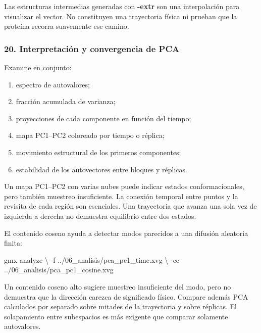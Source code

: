 \documentclass[
  spanish,
  11pt,
  a4paper]{article}
\newenvironment{Shaded}{\begin{snugshade}}{\end{snugshade}}
\newcommand{\AttributeTok}[1]{\textcolor[rgb]{0.13,0.29,0.53}{#1}}
\newcommand{\DataTypeTok}[1]{\textcolor[rgb]{0.13,0.29,0.53}{#1}}
\newcommand{\ExtensionTok}[1]{#1}
\newcommand{\NormalTok}[1]{#1}
\providecommand{\tightlist}{%
  \setlength{\itemsep}{0pt}\setlength{\parskip}{0pt}}
\begin{document}
Las estructuras intermedias generadas con \textbf{-extr} son una
interpolación para visualizar el vector. No constituyen una trayectoria
física ni prueban que la proteína recorra suavemente ese camino.

\subsubsection{20. Interpretación y convergencia de
PCA}\label{interpretaciuxf3n-y-convergencia-de-pca}

Examine en conjunto:

\begin{enumerate}
\def\labelenumi{\arabic{enumi}.}
\tightlist
\item
  espectro de autovalores;
\item
  fracción acumulada de varianza;
\item
  proyecciones de cada componente en función del tiempo;
\item
  mapa PC1--PC2 coloreado por tiempo o réplica;
\item
  movimiento estructural de los primeros componentes;
\item
  estabilidad de los autovectores entre bloques y réplicas.
\end{enumerate}

Un mapa PC1--PC2 con varias nubes puede indicar estados
conformacionales, pero también muestreo insuficiente. La conexión
temporal entre puntos y la revisita de cada región son esenciales. Una
trayectoria que avanza una sola vez de izquierda a derecha no demuestra
equilibrio entre dos estados.

El contenido coseno ayuda a detectar modos parecidos a una difusión
aleatoria finita:

\begin{Shaded}
\begin{Highlighting}[]
\ExtensionTok{gmx}\NormalTok{ analyze }\DataTypeTok{\textbackslash{}}
    \AttributeTok{{-}f}\NormalTok{ ../06\_analisis/pca\_pc1\_time.xvg }\DataTypeTok{\textbackslash{}}
    \AttributeTok{{-}cc}\NormalTok{ ../06\_analisis/pca\_pc1\_cosine.xvg}
\end{Highlighting}
\end{Shaded}

Un contenido coseno alto sugiere muestreo insuficiente del modo, pero no
demuestra que la dirección carezca de significado físico. Compare además
PCA calculados por separado sobre mitades de la trayectoria y sobre
réplicas. El solapamiento entre subespacios es más exigente que comparar
solamente autovalores.
\end{document}
